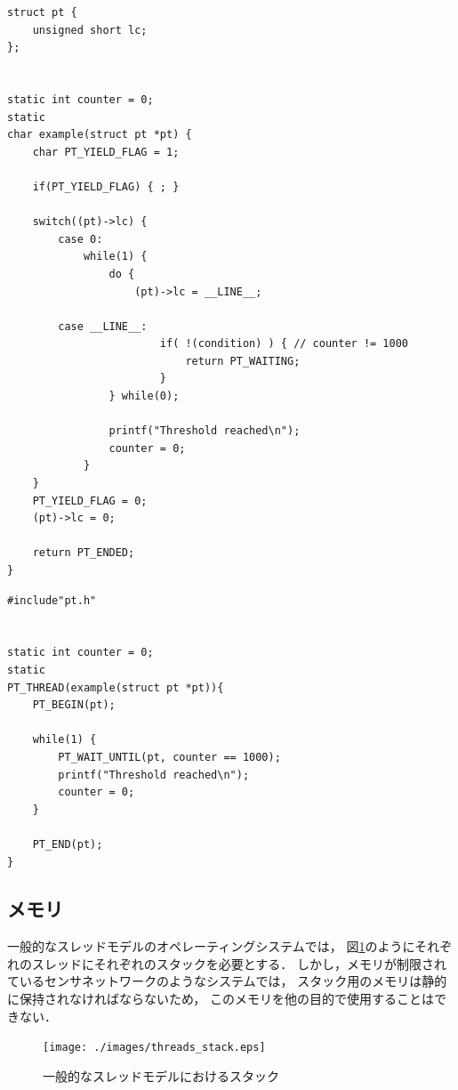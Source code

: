 \begin{lstlisting}[caption=Protothredsを使用せずに記述した場合, label={lst:non-protothreads}]
struct pt {
    unsigned short lc;
};


static int counter = 0;
static 
char example(struct pt *pt) { 
    char PT_YIELD_FLAG = 1;

    if(PT_YIELD_FLAG) { ; }

    switch((pt)->lc) {
        case 0:
            while(1) { 
                do {
                    (pt)->lc = __LINE__;

        case __LINE__:
                        if( !(condition) ) { // counter != 1000
                            return PT_WAITING;
                        } 
                } while(0);

                printf("Threshold reached\n");
                counter = 0;
            } 
    }
    PT_YIELD_FLAG = 0;
    (pt)->lc = 0;

    return PT_ENDED;
}
\end{lstlisting}


\clearpage

\begin{lstlisting}[caption=Protothredsを使用した場合, label={lst:using-protothreads}]
#include"pt.h"


static int counter = 0;
static
PT_THREAD(example(struct pt *pt)){
    PT_BEGIN(pt);

    while(1) {
        PT_WAIT_UNTIL(pt, counter == 1000);
        printf("Threshold reached\n");
        counter = 0;
    }
    
    PT_END(pt); 
}
\end{lstlisting}




\subsection{メモリ}\label{sec:memory}
一般的なスレッドモデルのオペレーティングシステムでは，
図\ref{fig:threads_stack}のようにそれぞれのスレッドにそれぞれのスタックを必要とする．
しかし，メモリが制限されているセンサネットワークのようなシステムでは，
スタック用のメモリは静的に保持されなければならないため，
このメモリを他の目的で使用することはできない．
\begin{figure}[htbp]
 \begin{center}
  \texttt{[image: ./images/threads\_stack.eps]}
 \end{center}
 \caption{一般的なスレッドモデルにおけるスタック}
 \label{fig:threads_stack}
\end{figure}

